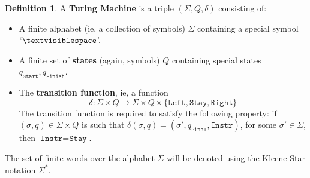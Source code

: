 \documentclass[12pt]{article}
\theoremstyle{plain}
\theoremstyle{definition}
\newtheorem{defn}[thm]{Definition} %
\newcommand{\lto}{\longrightarrow}
\begin{document}
	\begin{defn}\label{def:Turing_machine}
		A \textbf{Turing Machine} is a triple $(\Sigma, Q, \delta)$ consisting of:
		\begin{itemize}
			\item A finite alphabet (ie, a collection of symbols) $\Sigma$ containing a special symbol $`\textvisiblespace$'.
			\item A finite set of \textbf{states} (again, symbols) $Q$ containing special states $q_{\texttt{Start}}, q_{\texttt{Finish}}$.
			\item The \textbf{transition function}, ie, a function
			\begin{equation}
				\delta: \Sigma \times Q \lto \Sigma \times Q \times \lbrace \texttt{Left}, \texttt{Stay}, \texttt{Right}\rbrace
			\end{equation}
			The transition function is required to satisfy the following property: if $(\sigma, q) \in \Sigma \times Q$ is such that $\delta(\sigma, q) = (\sigma', q_{\texttt{Final}}, \texttt{Instr})$, for some $\sigma' \in \Sigma$, then $\texttt{Instr} = \texttt{Stay}$.
		\end{itemize}
	\end{defn}
	The set of finite words over the alphabet $\Sigma$ will be denoted using the Kleene Star notation $\Sigma^\ast$.
	
\end{document}
